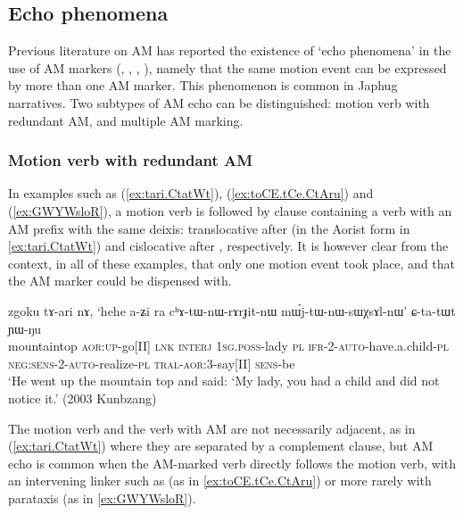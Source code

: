 \subsection{Echo phenomena} \label{sec:AM.echo}
Previous literature on AM has reported the existence of `echo phenomena' in the use of AM markers (\citealt[251]{wilkins91associated.motion}, \citealt[681--683]{vuillermet12eseejja}, \citealt[128--130]{rose15am}, \citealt[11]{guillaume16am}), namely that the same motion event can be expressed by more than one AM marker. This phenomenon is common in Japhug narratives. Two subtypes of AM echo can be distinguished: motion verb with redundant  AM, and multiple AM marking.

\subsubsection{Motion verb with redundant AM} \label{sec:redundant.AM}
In examples such as (\ref{ex:tari.CtatWt}), (\ref{ex:toCE.tCe.CtAru}) and (\ref{ex:GWYWsloR}), a motion verb is followed by clause containing a verb with an AM prefix with the same deixis: translocative after  (in the Aorist form  in \ref{ex:tari.CtatWt}) and cislocative after , respectively. It is however clear from the context, in all of these examples, that only one motion event took place, and that the AM marker could be dispensed with.
 
 \begin{exe}
\ex \label{ex:tari.CtatWt}
\gll zgoku tɤ-ari nɤ, `hehe a-ʑi ra cʰɤ-tɯ-nɯ-rɤrɟit-nɯ mɯ́j-tɯ-nɯ-sɯχsɤl-nɯ' ɕ-ta-tɯt ɲɯ-ŋu \\
mountaintop \textsc{aor}:\textsc{up}-go[II] \textsc{lnk} \textsc{interj} \textsc{1sg}.\textsc{poss}-lady \textsc{pl} \textsc{ifr}-2-\textsc{auto}-have.a.child-\textsc{pl} \textsc{neg}:\textsc{sens}-2-\textsc{auto}-realize-\textsc{pl} \textsc{tral}-\textsc{aor}:3\flobv{}-say[II] \textsc{sens}-be \\
\glt `He went up the mountain top and said: `My lady, you had a child and did not notice it.' (2003 Kunbzang)
\end{exe}

The motion verb and the verb with AM are not necessarily adjacent, as in (\ref{ex:tari.CtatWt}) where they are separated by a complement clause, but AM echo is common when the AM-marked verb directly follows the motion verb, with an intervening linker such as  (as in \ref{ex:toCE.tCe.CtAru}) or more rarely with parataxis (as in \ref{ex:GWYWsloR}).

